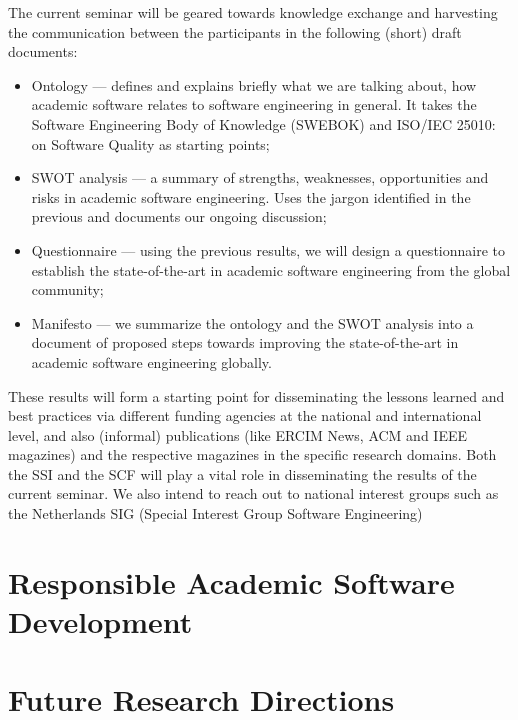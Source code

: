 \documentclass[a4paper,UKenglish]{dagman}
\begin{document}
The current seminar will be geared towards knowledge exchange and harvesting the communication between the participants in the following (short) draft documents:
\begin{itemize}
\item Ontology --- defines and explains briefly what we are talking about, how academic software relates to software engineering in general. It takes the Software Engineering Body of Knowledge (SWEBOK)\footnotemark {} and ISO/IEC 25010:\footnotemark~ on Software Quality as starting points; 
\item SWOT analysis --- a summary of strengths, weaknesses, opportunities and risks in academic software engineering. Uses the jargon identified in the previous and documents our ongoing discussion;
\item Questionnaire --- using the previous results, we will design a questionnaire to establish the state-of-the-art in academic software engineering from the global community;
\item Manifesto --- we summarize the ontology and the SWOT analysis into a document of proposed steps towards improving the state-of-the-art in academic software engineering globally.
\end{itemize} 

These results will form a starting point for disseminating the lessons learned and best practices via different funding agencies at the national and international level, and also (informal) publications (like ERCIM News, ACM and IEEE magazines) and the respective magazines in the specific research domains. Both the SSI and the SCF will play a vital role in disseminating the results of the current seminar. We also intend to reach out to national interest groups such as the Netherlands SIG (Special Interest Group Software Engineering)


\section{Responsible Academic Software Development}


\section{Future Research Directions}
\end{document}
